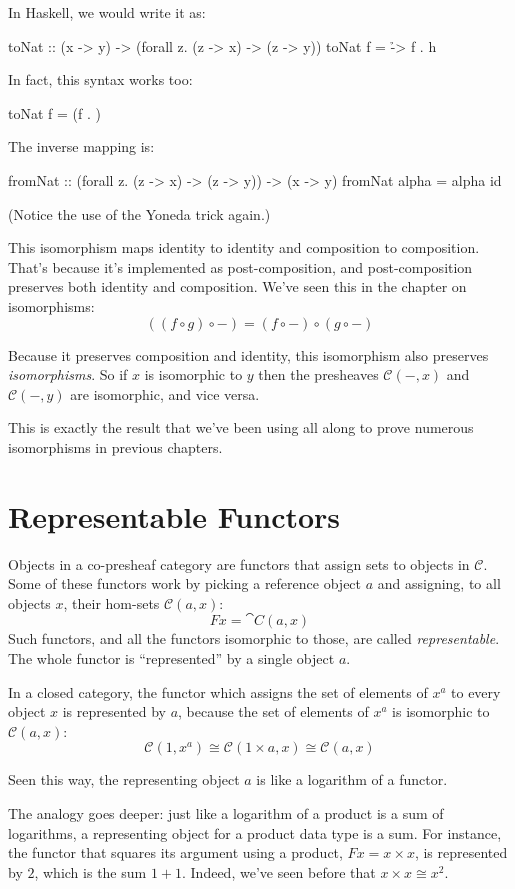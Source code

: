 \documentclass[DaoFP]{subfiles}
\begin{document}
In Haskell, we would write it as:
\begin{haskell}
toNat :: (x -> y) -> (forall z. (z -> x) -> (z -> y))
toNat f = \h -> f . h 
\end{haskell}
In fact, this syntax works too:
\begin{haskell}
toNat f = (f . )
\end{haskell}
The inverse mapping is:
\begin{haskell}
fromNat :: (forall z. (z -> x) -> (z -> y)) -> (x -> y)
fromNat alpha = alpha id
\end{haskell}
(Notice the use of the Yoneda trick again.)

This isomorphism maps identity to identity and composition to composition. That's because it's implemented as post-composition, and post-composition preserves both identity and composition. We've seen this in the chapter on isomorphisms:
\[ ((f \circ g) \circ -) = (f \circ -) \circ (g \circ -) \]

Because it preserves composition and identity, this isomorphism also preserves \emph{isomorphisms}. So if $x$ is isomorphic to $y$ then the presheaves $ \mathcal{C}(-, x)$ and $ \mathcal{C}(-, y)$ are isomorphic, and vice versa. 

This is exactly the result that we've been using all along to prove numerous isomorphisms in previous chapters. 

\section{Representable Functors}

Objects in a  co-presheaf category are functors that assign sets to objects in $\mathcal{C}$. Some of these functors work by picking a reference object $a$ and assigning,  to all objects $x$, their hom-sets  $\mathcal{C}(a, x)$:
\[ F x = \cat C(a, x) \]
Such functors, and all the functors isomorphic to those, are called \emph{representable}. The whole functor is ``represented'' by a single object $a$. 

In a closed category, the functor which assigns the set of elements of $x^a$ to every object $x$ is represented by $a$, because the set of elements of $x^a$ is isomorphic to $\mathcal{C}(a, x)$:
\[\mathcal{C}(1, x^a) \cong \mathcal{C}(1 \times a, x) \cong \mathcal{C} (a, x)\]

Seen this way, the representing object $a$ is like a logarithm of a functor. 

The analogy goes deeper: just like a logarithm of a product is a sum of logarithms, a representing object for a product data type is a sum. For instance, the functor that squares its argument using a product, $F x = x \times x$, is represented by $2$, which is the sum $1 + 1$. Indeed, we've seen before that $x \times x \cong x^2$.
\end{document}
